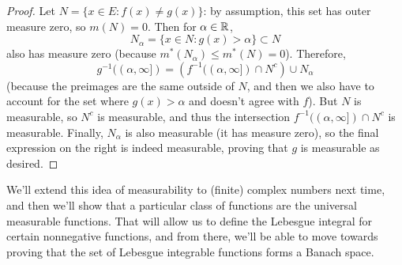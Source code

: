 \begin{proof}
Let $N = \{x \in E: f(x) \ne g(x)\}$: by assumption, this set has outer measure zero, so $m(N) = 0$. Then for $\alpha \in \mathbb R$, 
\[
    N_{\alpha} = \{x \in N: g(x) > \alpha\} \subset N
\]
also has measure zero (because $m^\ast(N_\alpha) \le m^\ast(N) = 0$). Therefore, 
\[
    g^{-1}((\alpha, \infty]) = \left(f^{-1}((\alpha, \infty]) \cap N^c\right) \cup N_\alpha
\]
(because the preimages are the same outside of $N$, and then we also have to account for the set where $g(x) > \alpha$ and doesn't agree with $f$). But $N$ is measurable, so $N^c$ is measurable, and thus the intersection $f^{-1}((\alpha, \infty]) \cap N^c$ is measurable. Finally, $N_\alpha$ is also measurable (it has measure zero), so the final expression on the right is indeed measurable, proving that $g$ is measurable as desired.
\end{proof}

We'll extend this idea of measurability to (finite) complex numbers next time, and then we'll show that a particular class of functions are the universal measurable functions. That will allow us to define the Lebesgue integral for certain nonnegative functions, and from there, we'll be able to move towards proving that the set of Lebesgue integrable functions forms a Banach space.
